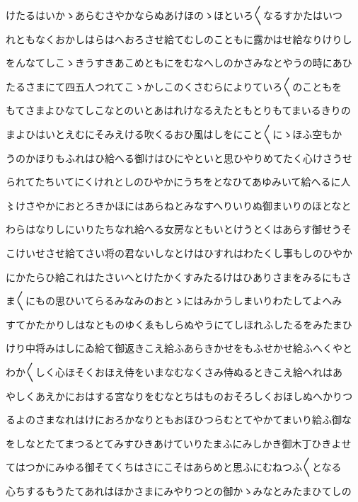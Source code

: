 \documentclass[a4paper,11pt,landscape]{ltjtarticle}
\begin{document}
\par\medskip
けたるはいかゝあらむさやかならぬあけほのゝほといろ〱なるすかたはいつ
\par\medskip
れともなくおかしはらはへおろさせ給てむしのこともに露かはせ給なりけりし
\par\medskip
をんなてしこゝきうすきあこめともにをむなへしのかさみなとやうの時にあひ
\par\medskip
たるさまにて四五人つれてこゝかしこのくさむらによりていろ〱のこともを
\par\medskip
もてさまよひなてしこなとのいとあはれけなるえたともとりもてまいるきりの
\par\medskip
まよひはいとえむにそみえける吹くるおひ風はしをにこと〱にゝほふ空もか
\par\medskip
うのかほりもふれはひ給へる御けはひにやといと思ひやりめてたく心けさうせ
\par\medskip
られてたちいてにくけれとしのひやかにうちをとなひてあゆみいて給へるに人
\par\medskip
〻けさやかにおとろきかほにはあらねとみなすへりいりぬ御まいりのほとなと
\par\medskip
わらはなりしにいりたちなれ給へる女房なともいとけうとくはあらす御せうそ
\par\medskip
こけいせさせ給てさい将の君ないしなとけはひすれはわたくし事もしのひやか
\par\medskip
にかたらひ給これはたさいへとけたかくすみたるけはひありさまをみるにもさ
\par\medskip
ま〱にもの思ひいてらるみなみのおとゝにはみかうしまいりわたしてよへみ
\par\medskip
すてかたかりしはなとものゆくゑもしらぬやうにてしほれふしたるをみたまひ
\par\medskip
けり中将みはしにゐ給て御返きこえ給ふあらきかせをもふせかせ給ふへくやと
\par\medskip
わか〱しく心ほそくおほえ侍をいまなむなくさみ侍ぬるときこえ給へれはあ
\par\medskip
やしくあえかにおはする宮なりをむなとちはものおそろしくおほしぬへかりつ
\par\medskip
るよのさまなれはけにおろかなりともおほひつらむとてやかてまいり給ふ御な
\par\medskip
をしなとたてまつるとてみすひきあけていりたまふにみしかき御木丁ひきよせ
\par\medskip
てはつかにみゆる御そてくちはさにこそはあらめと思ふにむねつふ〱となる
\par\medskip
心ちするもうたてあれはほかさまにみやりつとの御かゝみなとみたまひてしの
\par\medskip
\end{document}
